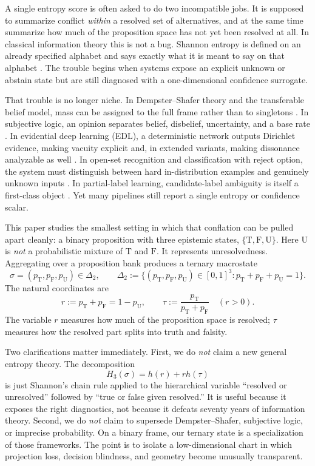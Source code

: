 \documentclass[11pt]{article}
\newcommand{\T}{\mathrm{T}}
\newcommand{\F}{\mathrm{F}}
\newcommand{\U}{\mathrm{U}}
\newcommand{\1}{\mathbf{1}}
\begin{document}
A single entropy score is often asked to do two incompatible jobs. It is supposed to summarize conflict \emph{within} a resolved set of alternatives, and at the same time summarize how much of the proposition space has not yet been resolved at all. In classical information theory this is not a bug. Shannon entropy is defined on an already specified alphabet and says exactly what it is meant to say on that alphabet \citep{Shannon48,CoverThomas06}. The trouble begins when systems expose an explicit unknown or abstain state but are still diagnosed with a one-dimensional confidence surrogate.

That trouble is no longer niche. In Dempster--Shafer theory and the transferable belief model, mass can be assigned to the full frame rather than to singletons \citep{Dempster67,Shafer76,SmetsKennes94}. In subjective logic, an opinion separates belief, disbelief, uncertainty, and a base rate \citep{Josang16}. In evidential deep learning (EDL), a deterministic network outputs Dirichlet evidence, making vacuity explicit and, in extended variants, making dissonance analyzable as well \citep{SensoyKaplanKandemir18,AguilarRaducanuRadevaVanDeWeijer23}. In open-set recognition and classification with reject option, the system must distinguish between hard in-distribution examples and genuinely unknown inputs \citep{GengHuangChen21,FrancPrusaVoracek23}. In partial-label learning, candidate-label ambiguity is itself a first-class object \citep{FuchsKalinkeBohm24}. Yet many pipelines still report a single entropy or confidence scalar.

This paper studies the smallest setting in which that conflation can be pulled apart cleanly: a binary proposition with three epistemic states, $\{\T,\F,\U\}$. Here $\U$ is \emph{not} a probabilistic mixture of $\T$ and $\F$. It represents unresolvedness. Aggregating over a proposition bank produces a ternary macrostate
\[
\sigma=(p_\T,p_\F,p_\U)\in\Delta_2,
\qquad
\Delta_2:=\{(p_\T,p_\F,p_\U)\in[0,1]^3: p_\T+p_\F+p_\U=1\}.
\]
The natural coordinates are
\[
 r:=p_\T+p_\F=1-p_\U,
 \qquad
 \tau:=\frac{p_\T}{p_\T+p_\F}
 \quad (r>0).
\]
The variable $r$ measures how much of the proposition space is resolved; $\tau$ measures how the resolved part splits into truth and falsity.

Two clarifications matter immediately. First, we do \emph{not} claim a new general entropy theory. The decomposition
\[
H_3(\sigma)=h(r)+r h(\tau)
\]
is just Shannon's chain rule applied to the hierarchical variable “resolved or unresolved” followed by “true or false given resolved.” It is useful because it exposes the right diagnostics, not because it defeats seventy years of information theory. Second, we do \emph{not} claim to supersede Dempster--Shafer, subjective logic, or imprecise probability. On a binary frame, our ternary state is a specialization of those frameworks. The point is to isolate a low-dimensional chart in which projection loss, decision blindness, and geometry become unusually transparent.
\end{document}
